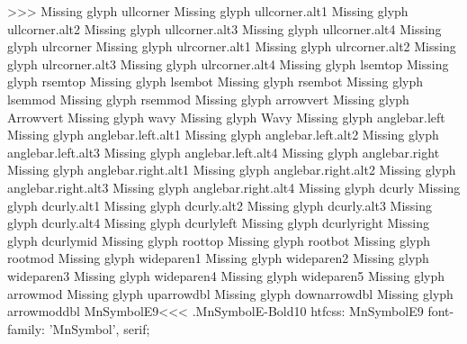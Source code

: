 >>>
Missing glyph	ullcorner
Missing glyph	ullcorner.alt1
Missing glyph	ullcorner.alt2
Missing glyph	ullcorner.alt3
Missing glyph	ullcorner.alt4
Missing glyph	ulrcorner
Missing glyph	ulrcorner.alt1
Missing glyph	ulrcorner.alt2
Missing glyph	ulrcorner.alt3
Missing glyph	ulrcorner.alt4
Missing glyph	lsemtop
Missing glyph	rsemtop
Missing glyph	lsembot
Missing glyph	rsembot
Missing glyph	lsemmod
Missing glyph	rsemmod
Missing glyph	arrowvert
Missing glyph	Arrowvert
Missing glyph	wavy
Missing glyph	Wavy
Missing glyph	anglebar.left
Missing glyph	anglebar.left.alt1
Missing glyph	anglebar.left.alt2
Missing glyph	anglebar.left.alt3
Missing glyph	anglebar.left.alt4
Missing glyph	anglebar.right
Missing glyph	anglebar.right.alt1
Missing glyph	anglebar.right.alt2
Missing glyph	anglebar.right.alt3
Missing glyph	anglebar.right.alt4
Missing glyph	dcurly
Missing glyph	dcurly.alt1
Missing glyph	dcurly.alt2
Missing glyph	dcurly.alt3
Missing glyph	dcurly.alt4
Missing glyph	dcurlyleft
Missing glyph	dcurlyright
Missing glyph	dcurlymid
Missing glyph	roottop
Missing glyph	rootbot
Missing glyph	rootmod
Missing glyph	wideparen1
Missing glyph	wideparen2
Missing glyph	wideparen3
Missing glyph	wideparen4
Missing glyph	wideparen5
Missing glyph	arrowmod
Missing glyph	uparrowdbl
Missing glyph	downarrowdbl
Missing glyph	arrowmoddbl
\<MnSymbolE9\><<<
.MnSymbolE-Bold10
htfcss:  MnSymbolE9  font-family: 'MnSymbol', serif;

